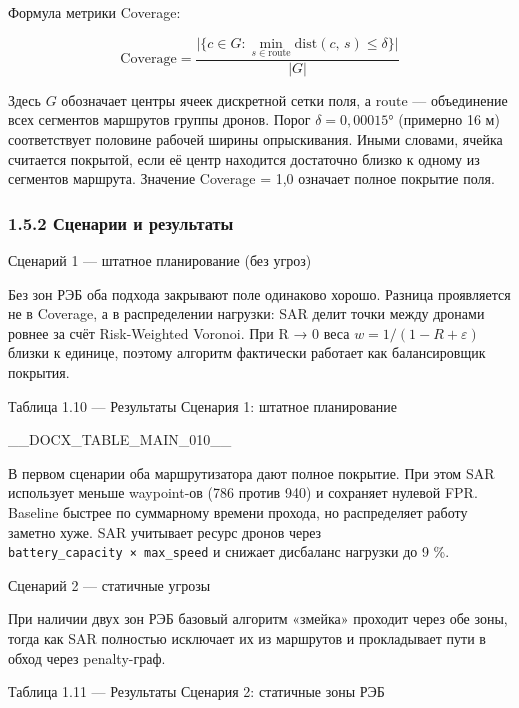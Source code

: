 \documentclass[14pt,a4paper]{extarticle}
\begin{document}
Формула метрики Coverage:

\[\mathrm{Coverage} = \frac{\bigl|\{c \in G : \min_{s \in \mathrm{route}} \mathrm{dist}(c,\, s) \leq \delta\}\bigr|}{|G|}\]

Здесь \(G\) обозначает центры ячеек дискретной сетки поля, а \(\mathrm{route}\) --- объединение всех сегментов маршрутов группы дронов. Порог \(\delta = 0{,}00015°\) (примерно 16 м) соответствует половине рабочей ширины опрыскивания. Иными словами, ячейка считается покрытой, если её центр находится достаточно близко к одному из сегментов маршрута. Значение Coverage = 1,0 означает полное покрытие поля.

\hypertarget{ux441ux446ux435ux43dux430ux440ux438ux438-ux438-ux440ux435ux437ux443ux43bux44cux442ux430ux442ux44b}{%
\subsubsection{1.5.2 Сценарии и результаты}\label{ux441ux446ux435ux43dux430ux440ux438ux438-ux438-ux440ux435ux437ux443ux43bux44cux442ux430ux442ux44b}}

Сценарий 1 --- штатное планирование (без угроз)

Без зон РЭБ оба подхода закрывают поле одинаково хорошо. Разница проявляется не в Coverage, а в распределении нагрузки: SAR делит точки между дронами ровнее за счёт Risk-Weighted Voronoi. При R → 0 веса \(w = 1/(1−R+ε)\) близки к единице, поэтому алгоритм фактически работает как балансировщик покрытия.

Таблица 1.10 --- Результаты Сценария 1: штатное планирование



__DOCX_TABLE_MAIN_010__



В первом сценарии оба маршрутизатора дают полное покрытие. При этом SAR использует меньше waypoint-ов (786 против 940) и сохраняет нулевой FPR. Baseline быстрее по суммарному времени прохода, но распределяет работу заметно хуже. SAR учитывает ресурс дронов через \texttt{battery\_capacity\ ×\ max\_speed} и снижает дисбаланс нагрузки до 9 \%.

Сценарий 2 --- статичные угрозы

При наличии двух зон РЭБ базовый алгоритм «змейка» проходит через обе зоны, тогда как SAR полностью исключает их из маршрутов и прокладывает пути в обход через penalty-граф.

Таблица 1.11 --- Результаты Сценария 2: статичные зоны РЭБ
\end{document}
